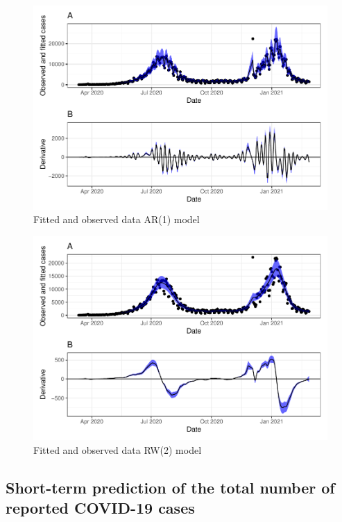 \documentclass[10pt,letterpaper]{article}
\begin{document}
\begin{figure}[H]
\includegraphics[width=0.99\linewidth]{COVIDincidenceSA_files/figure-latex/unnamed-chunk-6-1} \caption{Fitted and observed data AR(1) model}\label{fig:unnamed-chunk-6}
\end{figure}

\begin{figure}[H]
\includegraphics[width=0.99\linewidth]{COVIDincidenceSA_files/figure-latex/unnamed-chunk-7-1} \caption{Fitted and observed data RW(2) model}\label{fig:unnamed-chunk-7}
\end{figure}

\hypertarget{short-term-prediction-of-the-total-number-of-reported-covid-19-cases}{%
\subsection{Short-term prediction of the total number of reported
COVID-19
cases}\label{short-term-prediction-of-the-total-number-of-reported-covid-19-cases}}
\end{document}
